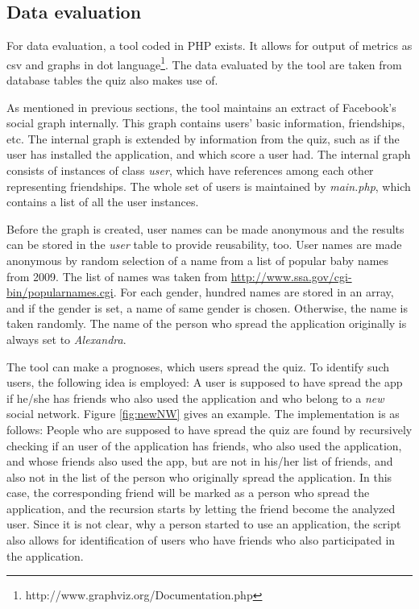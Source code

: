 \documentclass[preprint,12pt]{elsarticle}
\begin{document}
\subsection{Data evaluation}
\label{sec:data-evaluation}
For data evaluation, a tool coded in PHP exists. It allows for output
of metrics as \ac{csv} and graphs in \ac{dot}
language\footnote{http://www.graphviz.org/Documentation.php}.
The data evaluated by the tool are taken from
 database tables the quiz also makes use of.

As mentioned in previous sections, the tool maintains an extract of
Facebook's social graph internally. This graph contains users' basic
information, friendships, etc. The internal graph is
extended by information from the quiz, such as if the user has
installed the application, and which score a user had. The internal graph
consists of instances of class \textit{user}, which have references
among each other representing friendships. The whole set of users is
maintained by \textit{main.php}, which contains a list of all the user
instances. 

Before the graph is created, user names can be made anonymous and the
results can be stored in the \textit{user} table to provide
reusability, too. User names are made anonymous by random selection of
a name from a list of popular baby names from 2009. The list of names was
taken from \url{http://www.ssa.gov/cgi-bin/popularnames.cgi}.   
For each gender, hundred names are stored in an array, and if the
gender is set, a name of same gender is chosen. Otherwise, the name is
taken randomly. The name of the person who spread the application
originally is always set to \textit{Alexandra}.

The tool can make a prognoses, which users spread the quiz. To
identify such users, the following idea is employed:
A user is supposed to have spread the app if he/she has
friends who also used the application and who belong to a \textit{new}
social network. Figure \ref{fig:newNW} gives an example.
The implementation is as follows: People who are supposed to have
spread the quiz are found by recursively checking if an user of 
the application has friends, who also used the application, and whose friends
also used the app, but are not in his/her list of friends, and also not in the list of the person
who originally spread the application. In this case, the corresponding
friend will be marked as a person who spread the application, and the
recursion starts by letting the friend become the analyzed user.
Since it is not clear, why a person started to use an application, the
script also allows for identification of users who have friends 
who also participated in the application. 
\end{document}
